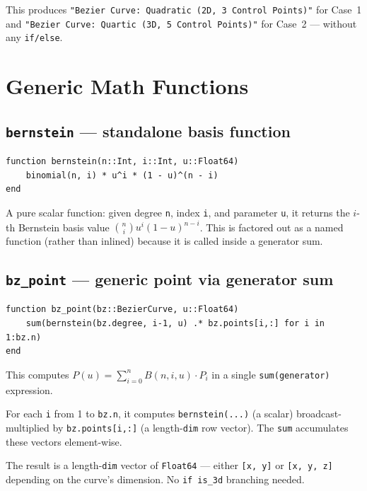 \documentclass[12pt, a4paper]{article}
\newcommand{\cd}[1]{\texttt{#1}}
\begin{document}
This produces \cd{"Bezier Curve: Quadratic (2D, 3 Control Points)"}
for Case~1 and \cd{"Bezier Curve: Quartic (3D, 5 Control Points)"}
for Case~2 --- without any \cd{if/else}.


\section{Generic Math Functions}

\subsection{\texttt{bernstein} --- standalone basis function}

\begin{verbatim}
function bernstein(n::Int, i::Int, u::Float64)
    binomial(n, i) * u^i * (1 - u)^(n - i)
end
\end{verbatim}

A pure scalar function: given degree \cd{n}, index \cd{i},
and parameter \cd{u}, it returns the $i$-th Bernstein
basis value $\binom{n}{i} u^i (1-u)^{n-i}$.
This is factored out as a named function (rather than
inlined) because it is called inside a generator sum.

\subsection{\texttt{bz\_point} --- generic point via generator sum}

\begin{verbatim}
function bz_point(bz::BezierCurve, u::Float64)
    sum(bernstein(bz.degree, i-1, u) .* bz.points[i,:] for i in 1:bz.n)
end
\end{verbatim}

This computes
$P(u) = \sum_{i=0}^{n} B(n,i,u) \cdot P_i$
in a single \cd{sum(generator)} expression.

For each \cd{i} from 1 to \cd{bz.n}, it computes
\cd{bernstein(...)} (a scalar) broadcast-multiplied by
\cd{bz.points[i,:]} (a length-\cd{dim} row vector).
The \cd{sum} accumulates these vectors element-wise.

The result is a length-\cd{dim} vector of \cd{Float64}
--- either \cd{[x, y]} or \cd{[x, y, z]} depending on
the curve's dimension.
No \cd{if is\_3d} branching needed.
\end{document}
